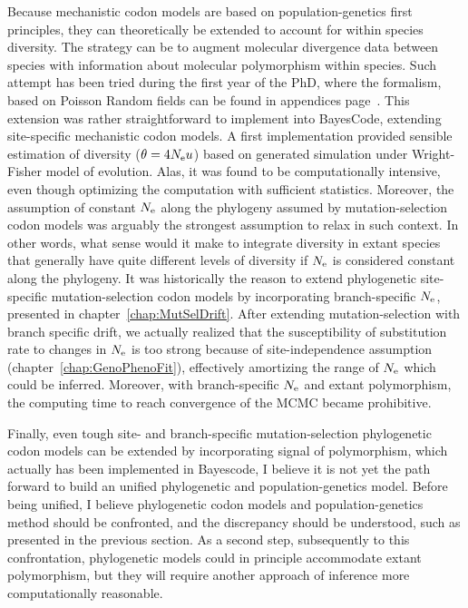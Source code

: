 Because mechanistic \gls{codon} models are based on population-genetics first principles, they can theoretically be extended to account for within species diversity.
The strategy can be to augment molecular divergence data between species with information about molecular polymorphism within species.
Such attempt has been tried during the first year of the PhD, where the formalism, based on Poisson Random fields can be found in appendices page~\pageref{sec-appendix:PRF}.
This extension was rather straightforward to implement into BayesCode, extending site-specific mechanistic codon models.
A first implementation provided sensible estimation of diversity ($\theta = 4 N_{\textrm{e}} u$) based on generated simulation under Wright-Fisher model of evolution.
Alas, it was found to be computationally intensive, even though optimizing the computation with sufficient statistics.
Moreover, the assumption of constant $N_{\textrm{e}}$ along the phylogeny assumed by mutation-selection codon models was arguably the strongest assumption to relax in such context.
In other words, what sense would it make to integrate diversity in extant species that generally have quite different levels of diversity if $N_{\textrm{e}}$ is considered constant along the phylogeny.
It was historically the reason to extend phylogenetic site-specific mutation-selection \gls{codon} models by incorporating branch-specific $N_{\textrm{e}}$, presented in chapter~\ref{chap:MutSelDrift}.
After extending mutation-selection with branch specific drift, we actually realized that the susceptibility of \gls{substitution} rate to changes in $N_{\textrm{e}}$ is too strong because of site-independence assumption (chapter~\ref{chap:GenoPhenoFit}), effectively amortizing the range of $N_{\textrm{e}}$ which could be inferred.
Moreover, with branch-specific $N_{\textrm{e}}$ and extant polymorphism, the computing time to reach convergence of the MCMC became prohibitive.

Finally, even tough site- and branch-specific mutation-selection phylogenetic \gls{codon} models can be extended by incorporating signal of polymorphism, which actually has been implemented in Bayescode, I believe it is not yet the path forward to build an unified phylogenetic and population-genetics model.
Before being unified, I believe phylogenetic codon models and population-genetics method should be confronted, and the discrepancy should be understood, such as presented in the previous section.
As a second step, subsequently to this confrontation, phylogenetic models could in principle accommodate extant polymorphism, but they will require another approach of inference more computationally reasonable.


